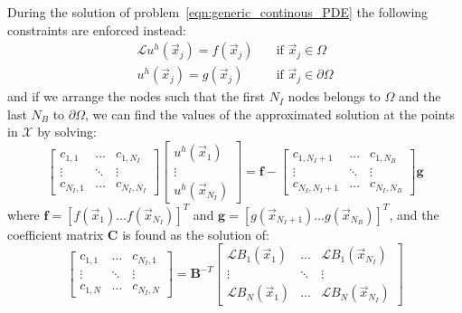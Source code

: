 During the solution of problem~\eqref{eqn:generic_continous_PDE} the following constraints are enforced instead:
\begin{equation}
	\begin{aligned}
		\mathcal{L} u^h(\vec{x}_j) = f(\vec{x}_j) \quad & \text{if $\vec{x}_j \in \Omega$}  \\
		u^h(\vec{x}_j) = g(\vec{x}_j) 						    \quad & \text{if $\vec{x}_j \in \partial\Omega$}
	\end{aligned}
\end{equation}
and if we arrange the nodes such that the first $N_I$ nodes belongs to $\Omega$ and the last $N_B$ to $\partial\Omega$, we can find the values of the approximated solution at the points in $\mathcal{X}$ by solving:
\begin{equation}
	\begin{bmatrix}
		c_{1,1} 		& 	\dots 		& c_{1,N_I}  \\
		\vdots			& \ddots	& \vdots		\\
		c_{N_I,1} & \dots		& c_{N_I,N_I}
	\end{bmatrix}
	\begin{bmatrix}
		u^h(\vec{x}_1)  \\
		\vdots					\\
		u^h(\vec{x}_{N_I})
	\end{bmatrix}
	=
	\boldsymbol{f} -
	\begin{bmatrix}
		c_{1,N_I+1} 		& 	\dots 		& c_{1,N_B}  \\
		\vdots			& \ddots	& \vdots		\\
		c_{N_I,N_I+1} & \dots		& c_{N_I,N_B}
	\end{bmatrix}
	\boldsymbol{g}
\end{equation}
where $\boldsymbol{f} = [f(\vec{x}_1) \dots f(\vec{x}_{N_I})]^T$ and $\boldsymbol{g} = [g(\vec{x}_{N_I+1}) \dots g(\vec{x}_{N_B})]^T$, and the coefficient matrix $\boldsymbol{C}$ is found as the solution of:
\begin{equation}
	\label{eqn:generic_discretized_PDE_by_MMs}
	\begin{bmatrix}
		c_{1,1} 		& 	\dots 		& c_{N_I,1}  \\
		\vdots			& \ddots	& \vdots		\\
		c_{1,N} & \dots		& c_{N_I,N}
	\end{bmatrix}
	=
	\boldsymbol{B}^{-T}
	\begin{bmatrix}
		\mathcal{L} B_1(\vec{x}_1)  & \dots		& \mathcal{L} B_1(\vec{x}_{N_I})     \\
		\vdots												& \ddots  & \vdots					      								  \\
		\mathcal{L} B_N(\vec{x}_1)  & \dots		& \mathcal{L} B_N(\vec{x}_{N_I})
	\end{bmatrix}
\end{equation}
